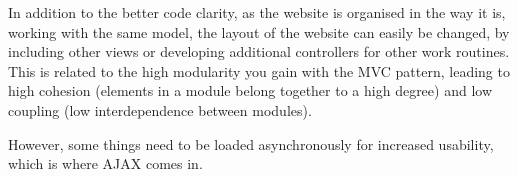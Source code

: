 In addition to the better code clarity, as the website is organised in the way it is, working with the same model, the layout of the website can easily be changed, by including other views or developing additional controllers for other work routines.
This is related to the high modularity you gain with the MVC pattern, leading to high cohesion (elements in a module belong together to a high degree) and low coupling (low interdependence between modules).

However, some things need to be loaded asynchronously for increased usability, which is where AJAX comes in.


